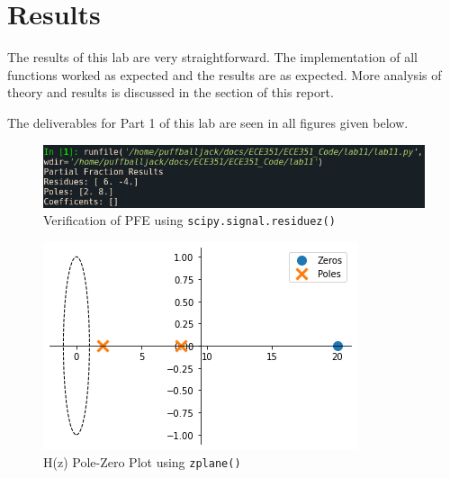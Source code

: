 \documentclass[12pt]{report}
\begin{document}
\section{Results}\label{section: Results}
The results of this lab are very straightforward. The implementation of all functions worked as expected and the results are as expected.
More analysis of theory and results is discussed in the  section of this report.

The deliverables for Part 1 of this lab are seen in all figures given below.
\\
\begin{figure}[h!]
  \centering
  \includegraphics[width=\linewidth]{t3.PNG}
  \caption{Verification of PFE using \texttt{scipy.signal.residuez()}}
  \label{fig: t3}
\end{figure}
\begin{figure}[h!]
  \centering
  \includegraphics[width=\linewidth]{t4.png}
  \caption{H(z) Pole-Zero Plot using \texttt{zplane()}}
  \label{fig: t4}
\end{figure}
\end{document}
